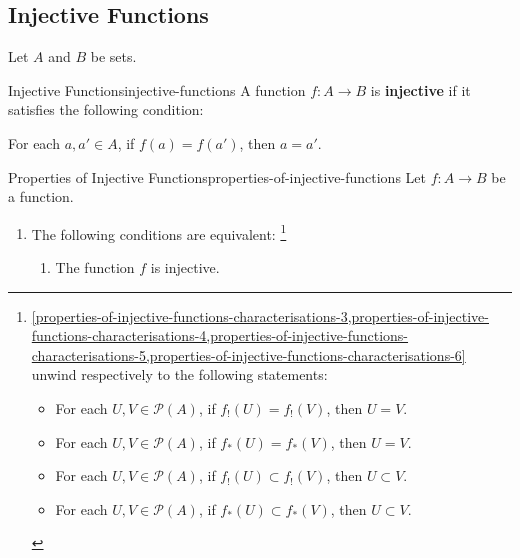 \subsection{Injective Functions}\label{subsection-injective-functions}
Let $A$ and $B$ be sets.
\begin{definition}{Injective Functions}{injective-functions}%
    A function $f\colon A\to B$ is \textbf{injective} if it satisfies the following condition:
    \begin{itemize}
        \itemstar For each $a,a'\in A$, if $f(a)=f(a')$, then $a=a'$.
    \end{itemize}
\end{definition}
\begin{proposition}{Properties of Injective Functions}{properties-of-injective-functions}%
    Let $f\colon A\to B$ be a function.
    \begin{enumerate}
        \item\label{properties-of-injective-functions-characterisations}The following conditions are equivalent:%
            \footnote{%
                \cref{properties-of-injective-functions-characterisations-3,properties-of-injective-functions-characterisations-4,properties-of-injective-functions-characterisations-5,properties-of-injective-functions-characterisations-6} unwind respectively to the following statements:
                \begin{itemize}
                    \item For each $U,V\in\mathcal{P}(A)$, if $f_{!}(U)=f_{!}(V)$, then $U=V$.%
                    \item For each $U,V\in\mathcal{P}(A)$, if $f_{*}(U)=f_{*}(V)$, then $U=V$.
                    \item For each $U,V\in\mathcal{P}(A)$, if $f_{!}(U)\subset f_{!}(V)$, then $U\subset V$.
                    \item For each $U,V\in\mathcal{P}(A)$, if $f_{*}(U)\subset f_{*}(V)$, then $U\subset V$.
                \end{itemize}
                \par\vspace*{\TCBBoxCorrection}
            }%
            \begin{enumerate}
                \item\label{properties-of-injective-functions-characterisations-1}The function $f$ is injective.

\end{enumerate}
\end{enumerate}
\end{proposition}
